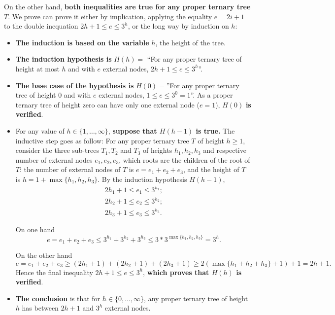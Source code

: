 \begin{enumerate}
\begin{solution}
\medskip

On the other hand, {\bf both inequalities are true for any proper
ternary tree} $T$.
%
We prove can prove it either by implication, applying the equality
$e=2i+1$ to the double inequation $2h+1\leq e \leq 3^h$, or the long
way by induction on $h$:

\begin{itemize}

\item {\bf The induction is based on the variable} $h$, the height of the tree.

\item {\bf The induction hypothesis is} $H(h)=$ ``For any proper
ternary tree of height at most $h$ and with $e$ external nodes,
%
$2h+1\leq e \leq 3^h$''.

\item {\bf The base case of the hypothesis is} $H(0)=$''For any proper
ternary tree of height $0$ and with $e$ external nodes,
$1\leq{e}\leq3^0=1$''.
%
As a proper ternary tree of height zero can have only one external
node ($e=1$), $H(0)$ {\bf is verified}.

\item For any value of $h\in\{1,\ldots,\infty\}$, {\bf suppose that
$H(h-1)$ is true.}  The inductive step goes as follow:
%
For any proper ternary tree $T$ of height $h\geq1$, consider the three
sub-trees $T_1,T_2$ and $T_3$ of heights $h_1,h_2,h_3$ and respective
number of external nodes $e_1,e_2,e_3$, which roots are the children
of the root of $T$: the number of external nodes of $T$ is
$e=e_1+e_2+e_3$, and the height of $T$ is $h=1+\max\{h_1,h_2,h_3\}$.
%
By the induction hypothesis $H(h-1)$,
\begin{eqnarray*}
2h_1+1\leq e_1 \leq 3^{h_1};\\
2h_2+1\leq e_2 \leq 3^{h_2};\\
2h_3+1\leq e_3 \leq 3^{h_3}.
\end{eqnarray*}

On one hand
$$e
=     e_1+e_2+e_3
\leq  3^{h_1}+3^{h_2}+3^{h_3}
\leq  3*3^{\max\{h_1,h_2,h_3\}}
=     3^{h}.$$

On the other hand
$$e
=     e_1+e_2+e_3
\geq (2h_1+1) + (2h_2+1) + (2h_3+1)
\geq 2(\max\{h_1+h_2+h_3\}+1) +1
= 2h+1.$$
%
Hence the final inequality $2h+1\leq e \leq 3^{h}$, {\bf which proves
that $H(h)$ is verified}.

\item {\bf The conclusion} is that for $h\in\{0,\ldots,\infty\}$, any
proper ternary tree of height $h$ has between $2h+1$ and $3^h$ external nodes.



\end{itemize}
\end{solution}
\end{enumerate}
